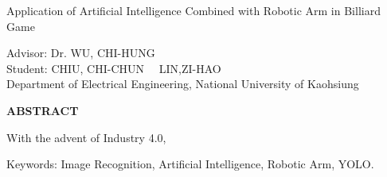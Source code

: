 {} %
    \fontsize{12}{13pt}\selectfont

    \begin{center}
        \LARGE
	Application of Artificial Intelligence Combined with Robotic Arm in Billiard Game

    \end{center}

    \begin{center}
        \small Advisor: Dr. WU, CHI-HUNG \\
        Student: CHIU, CHI-CHUN \ \
				LIN,ZI-HAO\\
        Department of Electrical Engineering, National University of Kaohsiung
    \end{center}

    \begin{center}
        {\large \bf ABSTRACT}
    \end{center}
    \hspace{7mm}
    \fontsize{8}{15pt}
	With the advent of Industry 4.0,
    \vspace{5mm}

    \noindent Keywords: Image Recognition, Artificial Intelligence, Robotic Arm, YOLO.
